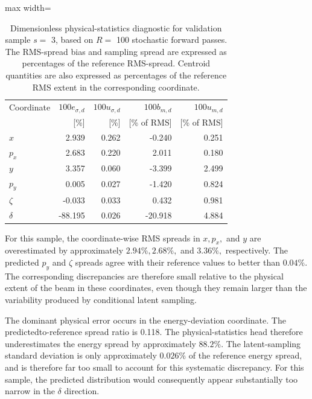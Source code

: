 \begin{table}[!htbp]
\centering\small
\caption{Dimensionless physical-statistics diagnostic for validation sample \(s =\) 3, based on \(R =\) 100 stochastic forward passes. The RMS-spread bias and sampling spread are expressed as percentages of the reference RMS-spread. Centroid quantities are also expressed as percentages of the reference RMS extent in the corresponding coordinate.}
\label{tab:12}
\begin{adjustbox}{max width=\linewidth}
\begin{tabular}{lrrrr}\toprule
Coordinate & $100e_{\sigma,d}$ & $100u_{\sigma,d}$ & $100b_{m,d}$ & $100u_{m,d}$\\
 & [\%] & [\%] & [\% of RMS] & [\% of RMS]\\\midrule
$x$ & 2.939 & 0.262 & -0.240 & 0.251\\
$p_x$ & 2.683 & 0.220 & 2.011 & 0.180\\
$y$ & 3.357 & 0.060 & -3.399 & 2.499\\
$p_y$ & 0.005 & 0.027 & -1.420 & 0.824\\
$\zeta$ & -0.033 & 0.033 & 0.432 & 0.981\\
$\delta$ & -88.195 & 0.026 & -20.918 & 4.884\\\bottomrule\end{tabular}
\end{adjustbox}
\end{table}

For this sample, the coordinate-wise RMS spreads in \(x , p_{x} ,\) and \(y\) are overestimated by approximately \(2.94 \% , 2.68 \% ,\) and \(3.36 \% ,\) respectively. The predicted \(p_{y}\) and \(\zeta\) spreads agree with their reference values to better than \(0.04 \% .\) The corresponding discrepancies are therefore small relative to the physical extent of the beam in these coordinates, even though they remain larger than the variability produced by conditional latent sampling.

The dominant physical error occurs in the energy-deviation coordinate. The predictedto-reference spread ratio is 0.118. The physical-statistics head therefore underestimates the energy spread by approximately \(88.2 \% .\) The latent-sampling standard deviation is only approximately \(0.026 \%\) of the reference energy spread, and is therefore far too small to account for this systematic discrepancy. For this sample, the predicted distribution would consequently appear substantially too narrow in the \(\delta\) direction.

